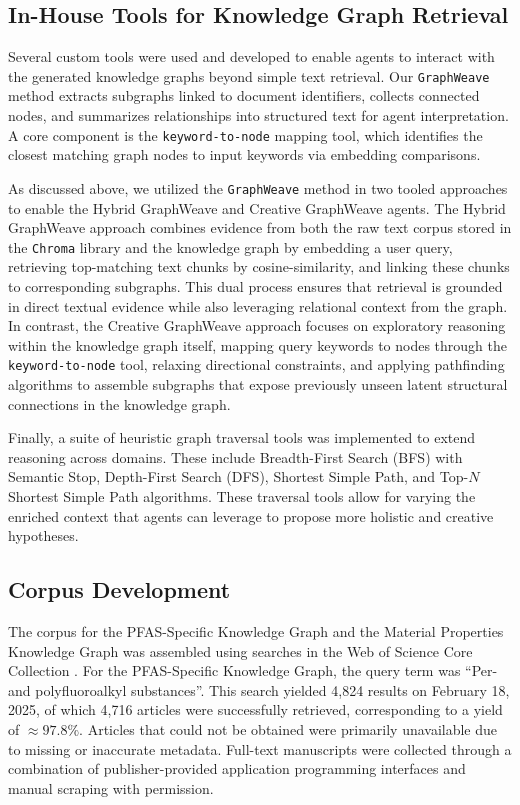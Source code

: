 \subsection{In-House Tools for Knowledge Graph Retrieval}

Several custom tools were used and developed to enable agents to interact with the generated knowledge graphs beyond simple text retrieval. Our \texttt{GraphWeave} method extracts subgraphs linked to document identifiers, collects connected nodes, and summarizes relationships into structured text for agent interpretation. A core component is the \texttt{keyword-to-node} mapping tool, which identifies the closest matching graph nodes to input keywords via embedding comparisons. 

As discussed above, we utilized the \texttt{GraphWeave} method in two tooled approaches to enable the Hybrid GraphWeave and Creative GraphWeave agents. The Hybrid GraphWeave approach combines evidence from both the raw text corpus stored in the \texttt{Chroma} library \cite{chroma} and the knowledge graph by embedding a user query, retrieving top-matching text chunks by cosine-similarity, and linking these chunks to corresponding subgraphs. This dual process ensures that retrieval is grounded in direct textual evidence while also leveraging relational context from the graph. In contrast, the Creative GraphWeave approach focuses on exploratory reasoning within the knowledge graph itself, mapping query keywords to nodes through the \texttt{keyword-to-node} tool, relaxing directional constraints, and applying pathfinding algorithms to assemble subgraphs that expose previously unseen latent structural connections in the knowledge graph. 

Finally, a suite of heuristic graph traversal tools was implemented to extend reasoning across domains. These include Breadth-First Search (BFS) with Semantic Stop, Depth-First Search (DFS), Shortest Simple Path, and Top-$N$ Shortest Simple Path algorithms. These traversal tools allow for varying the enriched context that agents can leverage to propose more holistic and creative hypotheses.

\subsection{Corpus Development}
The corpus for the PFAS-Specific Knowledge Graph and the Material Properties Knowledge Graph was assembled using searches in the Web of Science Core Collection \cite{clarivate2025}. For the PFAS-Specific Knowledge Graph, the query term was ``Per- and polyfluoroalkyl substances''. This search yielded 4,824 results on February 18, 2025, of which 4,716 articles were successfully retrieved, corresponding to a yield of $\approx 97.8\%$. Articles that could not be obtained were primarily unavailable due to missing or inaccurate metadata. Full-text manuscripts were collected through a combination of publisher-provided application programming interfaces and manual scraping with permission. 

